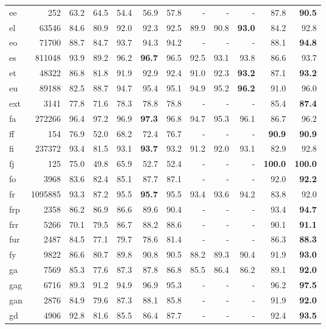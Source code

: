\documentclass[11pt,a4paper]{article}
\begin{document}
\begin{supertabular}{lrrr|rrr|rrr|rr}
ee & 252 & 63.2 & 64.5 & 54.4 & 56.9 & 57.8 & - & - & - & 87.8 & \textbf{90.5}\\
el & 63546 & 84.6 & 80.9 & 92.0 & 92.3 & 92.5 & 89.9 & 90.8 & \textbf{93.0} & 84.2 & 92.8\\
eo & 71700 & 88.7 & 84.7 & 93.7 & 94.3 & 94.2 & - & - & - & 88.1 & \textbf{94.8}\\
es & 811048 & 93.9 & 89.2 & 96.2 & \textbf{96.7} & 96.5 & 92.5 & 93.1 & 93.8 & 86.6 & 93.7\\
et & 48322 & 86.8 & 81.8 & 91.9 & 92.9 & 92.4 & 91.0 & 92.3 & \textbf{93.2} & 87.1 & \textbf{93.2}\\
eu & 89188 & 82.5 & 88.7 & 94.7 & 95.4 & 95.1 & 94.9 & 95.2 & \textbf{96.2} & 91.0 & 96.0\\
ext & 3141 & 77.8 & 71.6 & 78.3 & 78.8 & 78.8 & - & - & - & 85.4 & \textbf{87.4}\\
fa & 272266 & 96.4 & 97.2 & 96.9 & \textbf{97.3} & 96.8 & 94.7 & 95.3 & 96.1 & 86.7 & 96.2\\
ff & 154 & 76.9 & 52.0 & 68.2 & 72.4 & 76.7 & - & - & - & \textbf{90.9} & \textbf{90.9}\\
fi & 237372 & 93.4 & 81.5 & 93.1 & \textbf{93.7} & 93.2 & 91.2 & 92.0 & 93.1 & 82.9 & 92.8\\
fj & 125 & 75.0 & 49.8 & 65.9 & 52.7 & 52.4 & - & - & - & \textbf{100.0} & \textbf{100.0}\\
fo & 3968 & 83.6 & 82.4 & 85.1 & 87.7 & 87.1 & - & - & - & 92.0 & \textbf{92.2}\\
fr & 1095885 & 93.3 & 87.2 & 95.5 & \textbf{95.7} & 95.5 & 93.4 & 93.6 & 94.2 & 83.8 & 92.0\\
frp & 2358 & 86.2 & 86.9 & 86.6 & 89.6 & 90.4 & - & - & - & 93.4 & \textbf{94.7}\\
frr & 5266 & 70.1 & 79.5 & 86.7 & 88.2 & 88.6 & - & - & - & 90.1 & \textbf{91.1}\\
fur & 2487 & 84.5 & 77.1 & 79.7 & 78.6 & 81.4 & - & - & - & 86.3 & \textbf{88.3}\\
fy & 9822 & 86.6 & 80.7 & 89.8 & 90.8 & 90.5 & 88.2 & 89.3 & 90.4 & 91.9 & \textbf{93.0}\\
ga & 7569 & 85.3 & 77.6 & 87.3 & 87.8 & 86.8 & 85.5 & 86.4 & 86.2 & 89.1 & \textbf{92.0}\\
gag & 6716 & 89.3 & 91.2 & 94.9 & 96.9 & 95.3 & - & - & - & 96.2 & \textbf{97.5}\\
gan & 2876 & 84.9 & 79.6 & 87.3 & 88.1 & 85.8 & - & - & - & 91.9 & \textbf{92.0}\\
gd & 4906 & 92.8 & 81.6 & 85.5 & 86.4 & 87.7 & - & - & - & 92.4 & \textbf{93.5}\\

\end{supertabular}
\end{document}
